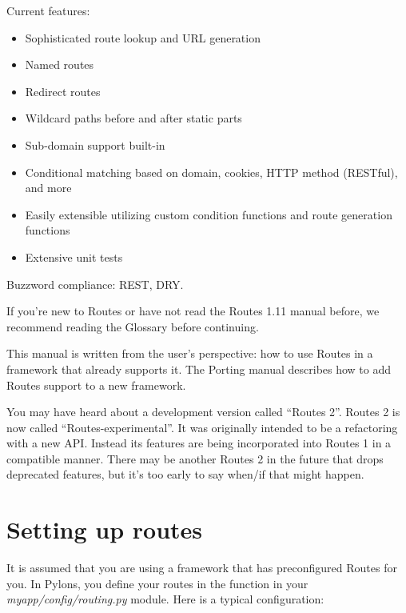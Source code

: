 \documentclass[letterpaper,10pt,english]{manual}
\begin{document}
Current features:
\begin{itemize}
\item {} 
Sophisticated route lookup and URL generation

\item {} 
Named routes

\item {} 
Redirect routes

\item {} 
Wildcard paths before and after static parts

\item {} 
Sub-domain support built-in

\item {} 
Conditional matching based on domain, cookies, HTTP method (RESTful), and more

\item {} 
Easily extensible utilizing custom condition functions and route generation
functions

\item {} 
Extensive unit tests

\end{itemize}

Buzzword compliance:  REST, DRY.

If you're new to Routes or have not read the Routes 1.11 manual before, we
recommend reading the Glossary before continuing.

This manual is written from the user's perspective: how to use Routes in a
framework that already supports it. The Porting
manual describes how to add Routes support to a new framework.

You may have heard about a development version called ``Routes 2''.  Routes 2 is
now called ``Routes-experimental''.  It was originally intended to be a
refactoring with a new API.  Instead its features are being incorporated into
Routes 1 in a compatible manner.  There may be another Routes 2 in the future
that drops deprecated features, but it's too early to say when/if that might
happen.

\resetcurrentobjects
\hypertarget{--doc-setting_up}{}

\chapter{Setting up routes}

It is assumed that you are using a framework that has preconfigured Routes for
you.  In Pylons, you define your routes in the  function in your
\emph{myapp/config/routing.py} module.  Here is a typical configuration:
\end{document}
